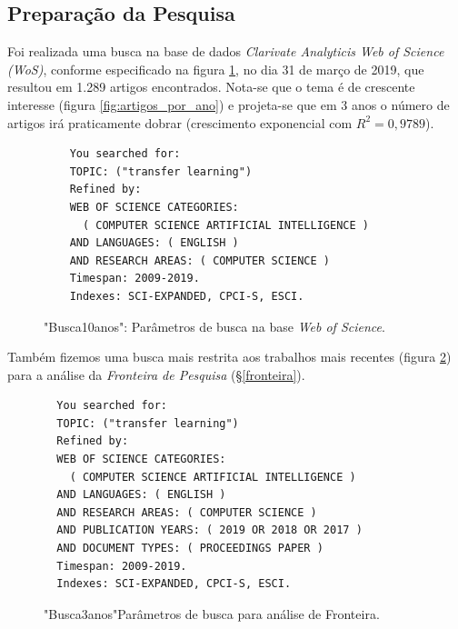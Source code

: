 \documentclass[sigconf]{acmart}
\begin{document}
\subsection{Preparação da Pesquisa}
Foi realizada uma busca na base de dados \emph{Clarivate Analyticis Web of Science (WoS)}, conforme especificado na figura \ref{card:wos}, no dia 31 de março de 2019, que resultou em 1.289 artigos encontrados. Nota-se que o tema é de crescente interesse (figura \ref{fig:artigos_por_ano}) e projeta-se que em 3 anos o número de artigos irá praticamente dobrar (crescimento exponencial com $R^2=0,9789$). 
\begin{figure}[htp]

\begin{tcolorbox}[colback=yellow!5!white,colframe=gray!75!black,title={Results: 1,289 (from Web of Science Core Collection)}]
  \footnotesize{
    \begin{verbatim}
    You searched for: 
    TOPIC: ("transfer learning")
    Refined by: 
    WEB OF SCIENCE CATEGORIES: 
      ( COMPUTER SCIENCE ARTIFICIAL INTELLIGENCE )
    AND LANGUAGES: ( ENGLISH ) 
    AND RESEARCH AREAS: ( COMPUTER SCIENCE )
    Timespan: 2009-2019. 
    Indexes: SCI-EXPANDED, CPCI-S, ESCI.
    \end{verbatim}
  }

\end{tcolorbox}
\caption{"Busca10anos": Parâmetros de busca na base \emph{Web of Science}.}
\label{card:wos}
\end{figure}

Também fizemos uma busca mais restrita aos trabalhos mais recentes (figura \ref{card:sota}) para a análise da \emph{Fronteira de Pesquisa} (\S \ref{fronteira}).
\begin{figure}[htp]
  \begin{tcolorbox}[colback=yellow!5!white,colframe=gray!75!black,title={Results: 384 (from Web of Science Core Collection)}]
    \footnotesize{
  \begin{verbatim}
  You searched for: 
  TOPIC: ("transfer learning")
  Refined by: 
  WEB OF SCIENCE CATEGORIES: 
    ( COMPUTER SCIENCE ARTIFICIAL INTELLIGENCE )
  AND LANGUAGES: ( ENGLISH ) 
  AND RESEARCH AREAS: ( COMPUTER SCIENCE )
  AND PUBLICATION YEARS: ( 2019 OR 2018 OR 2017 )
  AND DOCUMENT TYPES: ( PROCEEDINGS PAPER )
  Timespan: 2009-2019. 
  Indexes: SCI-EXPANDED, CPCI-S, ESCI.
  \end{verbatim}
    }
  
  \end{tcolorbox}
  \caption{"Busca3anos"Parâmetros de busca para análise de Fronteira.}
  \label{card:sota}
\end{figure}
\end{document}
